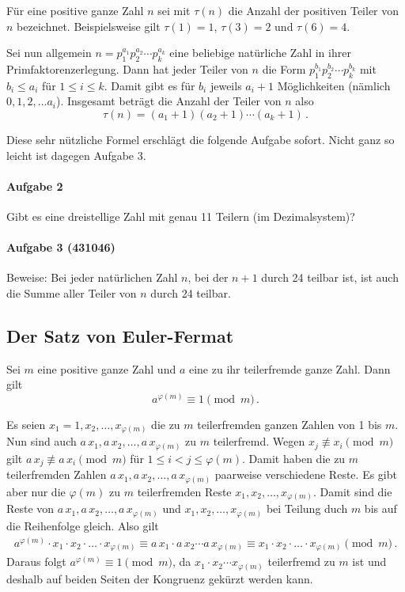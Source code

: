 \documentclass[11pt,a4paper]{article}
\begin{document}
Für eine positive ganze Zahl $n$ sei mit $\tau(n)$ die Anzahl der positiven
Teiler von $n$ bezeichnet. Beispielsweise gilt $\tau(1)=1$, $\tau(3)=2$ und
$\tau(6)=4$.

Sei nun allgemein $n=p_{1}^{a_{1}}p_{2}^{a_{2}}\cdots p_{k}^{a_{k}}$ eine
beliebige natürliche Zahl in ihrer Primfaktorenzerlegung. Dann hat jeder
Teiler von $n$ die Form $p_{1}^{b_{1}}p_{2}^{b_{2}}\cdots p_{k}^{b_{k}}$ mit
$b_{i}\leq a_{i}$ für $1\leq i\leq k$. Damit gibt es für $b_{i}$ jeweils
$a_{i}+1$ Möglichkeiten (nämlich $0,1,2,\dots a_{i}$). Insgesamt beträgt die
Anzahl der Teiler von $n$ also 
\[\tau(n)=(a_{1}+1)(a_{2}+1)\cdots(a_{k}+1)\,.\]

Diese sehr nützliche Formel erschlägt die folgende Aufgabe sofort. Nicht ganz
so leicht ist dagegen Aufgabe 3.

\paragraph{Aufgabe 2} 
Gibt es eine dreistellige Zahl mit genau 11 Teilern (im Dezimalsystem)? 

\paragraph{Aufgabe 3 (431046)} 
Beweise: Bei jeder natürlichen Zahl $n$, bei der $n+1$ durch 24 teilbar ist,
ist auch die Summe aller Teiler von $n$ durch 24 teilbar.

\subsection*{Der Satz von Euler-Fermat}

\begin{satz}
Sei $m$ eine positive ganze Zahl und $a$ eine zu ihr teilerfremde ganze Zahl.
Dann gilt \[a^{\varphi(m)}\equiv 1\pmod{m}\,.\]
\end{satz}
\begin{beweis}
Es seien $x_{1}=1, x_{2}, \dots ,x_{\varphi(m)}$ die zu $m$ teilerfremden
ganzen Zahlen von 1 bis $m$. Nun sind auch $a\,x_{1}, a\,x_{2}, \dots ,
a\,x_{\varphi(m)}$ zu $m$ teilerfremd. Wegen $x_{j}\not\equiv x_{i}\pmod{m}$
gilt $a\,x_{j}\not\equiv a\,x_{i}\pmod{m}$ für $1\leq i<j\leq \varphi(m)$.
Damit haben die zu $m$ teilerfremden Zahlen $a\,x_{1}, a\,x_{2}, \dots ,
a\,x_{\varphi(m)}$ paarweise verschiedene Reste. Es gibt aber nur die
$\varphi(m)$ zu $m$ teilerfremden Reste $x_{1},x_{2}, \dots ,
x_{\varphi(m)}$. Damit sind die Reste von $a\,x_{1}, a\,x_{2}, \dots ,
a\,x_{\varphi(m)}$ und $x_{1},x_{2}, \dots ,x_{\varphi(m)}$ bei Teilung duch
$m$ bis auf die Reihenfolge gleich. Also gilt
\begin{gather*}
  a^{\varphi(m)}\cdot x_{1}\cdot x_{2}\cdot\ldots\cdot x_{\varphi(m)}\equiv
  a\,x_{1}\cdot a\,x_{2}\cdots a\,x_{\varphi(m)}\equiv x_{1}\cdot x_{2}
  \cdot\ldots\cdot x_{\varphi(m)}\pmod{m}\,.
\end{gather*}
Daraus folgt $a^{\varphi(m)}\equiv 1\pmod{m}$, da $x_{1}\cdot x_{2}\cdots
x_{\varphi(m)}$ teilerfremd zu $m$ ist und deshalb auf beiden Seiten der
Kongruenz gekürzt werden kann. 
\end{beweis}
\end{document}

